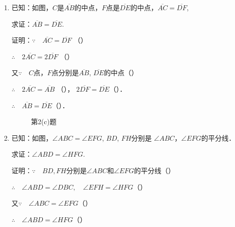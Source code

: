 \begin{enumerate}
\begin{enumerate}
\item 已知：如图，$C$是$\overline{AB}$的中点，$F$点是$\overline{DE}$的中点，$\overline{AC}=\overline{DF}$, 

求证：$\overline{AB}=\overline{DE}$.

证明：$\because\quad \overline{AC}=\overline{DF}$ （\qquad）

$\therefore\quad 2\overline{AC}=2\overline{DF}$ （\qquad）

又$\because\quad C$点，$F$点分别是$\overline{AB}$, $\overline{DE}$的中点（\qquad）

$\therefore\quad 2\overline{AC}=\overline{AB}$ （\qquad），
$2\overline{DF}=\overline{DE}$（\qquad）．

$\therefore\quad \overline{AB}=\overline{DE}$（\qquad）．

\begin{figure}[htp]\centering
    \begin{minipage}[t]{0.48\textwidth}
    \centering
{}
    \caption*{第2(b)题}
    \end{minipage}
    \begin{minipage}[t]{0.48\textwidth}
    \centering
    \caption*{第2(c)题}
    \end{minipage}
    \end{figure}


\item 已知：如图，$\angle ABC=\angle EFG$, $BD$, $FH$分别是
$\angle ABC$，$\angle EFG$的平分线．

求证：$\angle ABD=\angle HFG$.

证明：$\because\quad BD, FH$分别是$\angle ABC$和$\angle EFG$的平分线（\qquad ）

$\therefore\quad \angle ABD=\angle DBC,\quad \angle EFH=\angle HFG$（\qquad）

又$\because\quad \angle ABC=\angle EFG$（\qquad）

$\therefore\quad \angle ABD=\angle HFG$（\qquad）


\end{enumerate}
\end{enumerate}
